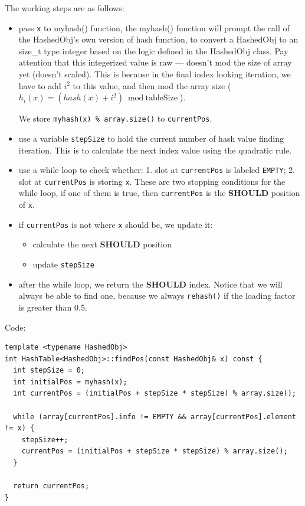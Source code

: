 \documentclass[11pt]{book}
\begin{document}
The working steps are as follows:
\begin{itemize}
\item pass \texttt{x} to myhash() function, the myhash() function will prompt the call of the HashedObj's own version of hash function, to convert a HashedObj to an size\_t type integer based on the logic defined in the HashedObj class. Pay attention that this integerized value is raw --- doesn't mod the size of array yet (doesn't scaled). This is because in the final index looking iteration, we have to add \(i^2\) to this value, and then mod the array size (\(h_i(x) = (hash(x) + i^2) \bmod \text{tableSize}\)).

We store \texttt{myhash(x) \% array.size()} to \texttt{currentPos}.
\item use a variable \texttt{stepSize} to hold the current number of hash value finding iteration. This is to calculate the next index value using the quadratic rule.
\item use a while loop to check whether: 1. slot at \texttt{currentPos} is labeled \texttt{EMPTY}; 2. slot at \texttt{currentPos} is storing \texttt{x}. These are two stopping conditions for the while loop, if one of them is true, then \texttt{currentPos} is the \textbf{SHOULD} position of \texttt{x}.
\item if \texttt{currentPos} is not where \texttt{x} should be, we update it:
\begin{itemize}
\item calculate the next \textbf{SHOULD} position
\item update \texttt{stepSize}
\end{itemize}
\item after the while loop, we return the \textbf{SHOULD} index. Notice that we will always be able to find one, because we always \texttt{rehash()} if the loading factor is greater than 0.5.
\end{itemize}

Code:
\begin{verbatim}
template <typename HashedObj>
int HashTable<HashedObj>::findPos(const HashedObj& x) const {
  int stepSize = 0;
  int initialPos = myhash(x);
  int currentPos = (initialPos + stepSize * stepSize) % array.size();

  while (array[currentPos].info != EMPTY && array[currentPos].element != x) {
    stepSize++;
    currentPos = (initialPos + stepSize * stepSize) % array.size();
  }

  return currentPos;  
}
\end{verbatim}
\end{document}
